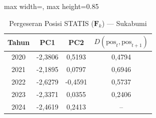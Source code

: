 \begin{table}[H]
\centering
\caption{Pergeseran Posisi STATIS ($\mathbf{F}_k$) --- Sukabumi} \label{tab:app1jarak_statis_skor_sukabumi}
\begin{adjustbox}{max width=\textwidth, max height=0.85\textheight}
\begin{tabular}{|c|c|c|c|}
\hline
\textbf{Tahun} & \textbf{PC1} & \textbf{PC2} & \textbf{$D(\text{pos}_t, \text{pos}_{t+1})$} \\
\hline
2020 & -2,3806 & 0,5193 & 0,4794 \\
2021 & -2,1895 & 0,0797 & 0,6946 \\
2022 & -2,6279 & -0,4591 & 0,5737 \\
2023 & -2,3371 & 0,0355 & 0,2406 \\
2024 & -2,4619 & 0,2413 & -- \\
\hline
\end{tabular}
\end{adjustbox}
\end{table}